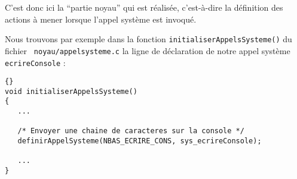    C'est donc ici la ``partie noyau'' qui est réalisée, c'est-à-dire
la définition des actions à mener lorsque l'appel système est invoqué.

   Nous trouvons par exemple dans la fonction
\lstinline!initialiserAppelsSysteme()! du fichier {\tt
  noyau/appelsysteme.c} la ligne de déclaration de notre appel système
\lstinline!ecrireConsole! :

\begin{lstlisting}{}
void initialiserAppelsSysteme()
{
   ...
  
   /* Envoyer une chaine de caracteres sur la console */
   definirAppelSysteme(NBAS_ECRIRE_CONS, sys_ecrireConsole);

   ...
}
\end{lstlisting}{}

